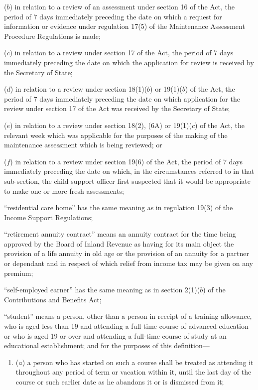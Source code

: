 \documentclass[12pt,a4paper]{article}
\begin{document}
\begin{enumerate}
\begin{enumerate}

($b$) in relation to a review of an assessment under section 16 of the Act, the period of 7 days immediately preceding the date on which a request for information or evidence under regulation 17(5) of the Maintenance Assessment Procedure Regulations is made;

($c$) in relation to a review under section 17 of the Act, the period of 7 days immediately preceding the date on which the application for review is received by the Secretary of State;

($d$) in relation to a review under section 18(1)($b$) or 19(1)($b$) of the Act, the period of 7 days immediately preceding the date on which application for the review under section 17 of the Act was received by the Secretary of State;

($e$) in relation to a review under section 18(2), (6A) or 19(1)($c$) of the Act, the relevant week which was applicable for the purposes of the making of the maintenance assessment which is being reviewed; or

($f$) in relation to a review under section 19(6) of the Act, the period of 7 days immediately preceding the date on which, in the circumstances referred to in that sub-section, the child support officer first suspected that it would be appropriate to make one or more fresh assessments;
\end{enumerate}

“residential care home” has the same meaning as in regulation 19(3) of the Income Support Regulations;

“retirement annuity contract” means an annuity contract for the time being approved by the Board of Inland Revenue as having for its main object the provision of a life annuity in old age or the provision of an annuity for a partner or dependant and in respect of which relief from income tax may be given on any premium;

“self-employed earner” has the same meaning as in section 2(1)($b$) of the Contributions and Benefits Act;

“student” means a person, other than a person in receipt of a training allowance, who is aged less than 19 and attending a full-time course of advanced education or who is aged 19 or over and attending a full-time course of study at an educational establishment; and for the purposes of this definition—
\begin{enumerate}\item[]
($a$)
a person who has started on such a course shall be treated as attending it throughout any period of term or vacation within it, until the last day of the course or such earlier date as he abandons it or is dismissed from it;


\end{enumerate}
\end{enumerate}
\end{document}
